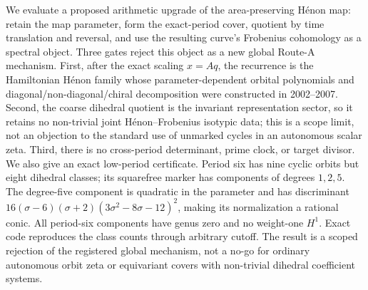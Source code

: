 We evaluate a proposed arithmetic upgrade of the area-preserving H\'enon map:
retain the map parameter, form the exact-period cover, quotient by time
translation and reversal, and use the resulting curve's Frobenius cohomology
as a spectral object.  Three gates reject this object as a new global
Route-A mechanism.
First, after the exact scaling $x=Aq$, the recurrence is the Hamiltonian
H\'enon family whose parameter-dependent orbital polynomials and
diagonal/non-diagonal/chiral decomposition were constructed in 2002--2007.
Second, the coarse dihedral quotient is the invariant representation sector,
so it retains no non-trivial joint H\'enon--Frobenius isotypic data; this is a
scope limit, not an objection to the standard use of unmarked cycles in an
autonomous scalar zeta.  Third, there is no cross-period determinant, prime
clock, or target divisor.  We also give an exact low-period certificate.
Period six has nine cyclic orbits but eight
dihedral classes; its squarefree marker has components of degrees $1,2,5$.
The degree-five component is quadratic in the parameter and has discriminant
$16(\sigma-6)(\sigma+2)(3\sigma^2-8\sigma-12)^2$, making its normalization a
rational conic.  All period-six components have genus zero and no weight-one
$H^1$.  Exact code reproduces the class counts through arbitrary cutoff.  The
result is a scoped rejection of the registered global mechanism, not a no-go
for ordinary autonomous orbit zeta or equivariant covers with non-trivial
dihedral coefficient systems.
